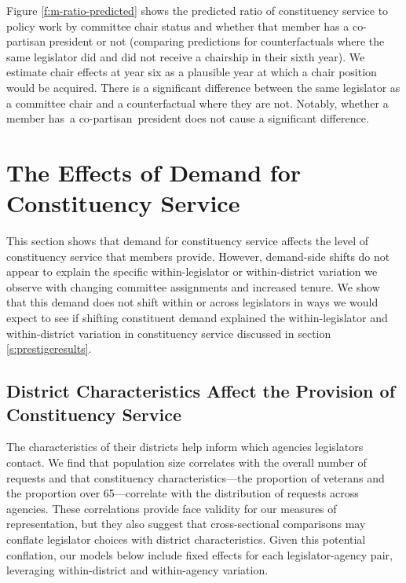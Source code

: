 \documentclass[12pt]{article}
\begin{document}
Figure \ref{f:m-ratio-predicted} shows the predicted ratio of constituency service to policy work by committee chair status and whether that member has a co-partisan president or not (comparing predictions for counterfactuals where the same legislator did and did not receive a chairship in their sixth year). We estimate chair effects at year six as a plausible year at which a chair position would be acquired. %
There is a significant difference between the same legislator as a committee chair and a counterfactual where they are not. Notably, whether a member has a co-partisan president does not cause a significant difference. 



\section{The Effects of Demand for Constituency Service}\label{s:demand} 

This section shows that demand for constituency service affects the level of constituency service that members provide. However, demand-side shifts do not appear to explain the specific within-legislator or within-district variation we observe with changing committee assignments and increased tenure. %
We show that this demand does not shift within or across legislators in ways we would expect to see if shifting constituent demand explained the within-legislator and within-district variation in constituency service discussed in section \ref{s:prestigeresults}.

\subsection{District Characteristics Affect the Provision of Constituency Service}

The characteristics of their districts help inform which agencies legislators contact. We find that population size correlates with the overall number of requests and that constituency characteristics—the proportion of veterans and the proportion over 65—correlate with the distribution of requests across agencies. These correlations provide face validity for our measures of representation, but they also suggest that cross-sectional comparisons may conflate legislator choices with district characteristics. Given this potential conflation, our models below include fixed effects for each legislator-agency pair, leveraging within-district and within-agency variation.  
\end{document}

